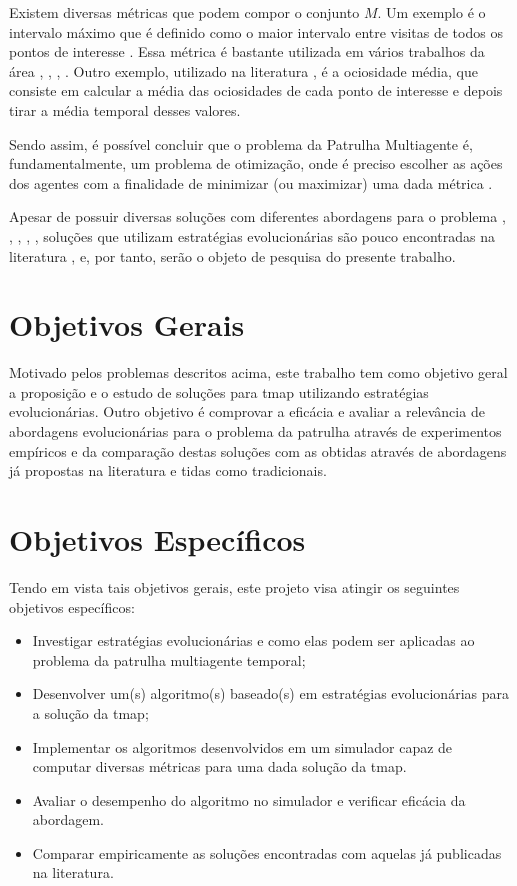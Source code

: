 Existem diversas métricas que podem compor o conjunto $M$. Um exemplo é o 
intervalo máximo que é definido como o maior intervalo entre visitas de todos os 
pontos de interesse \citep{sampaiophd}. Essa métrica é bastante utilizada em 
vários trabalhos da área \citep{6900280}, \cite{Pippin:2013:PBT:2480362.2480378}, 
\citep{Chevaleyre:2004:TAM:1018411.1019013}, \citep{6615158}. Outro exemplo, 
utilizado na literatura \citep{hernandez2013game}, é a ociosidade média, que 
consiste em calcular a média das ociosidades de cada ponto de interesse e depois 
tirar a média temporal desses valores.

Sendo assim, é possível concluir que o problema da Patrulha Multiagente é, 
fundamentalmente, um problema de otimização, onde é preciso escolher as ações 
dos agentes com a finalidade de minimizar (ou maximizar) uma dada métrica 
\citep{sampaiophd}.

Apesar de possuir diversas soluções com diferentes abordagens para o problema 
\citep{Chevaleyre:2004:TAM:1018411.1019013}, 
\citep{Machado:2002:MPE:1765317.1765332}, \citep{Almeida:2004:AAI}, 
\citep{4209122}, \citep{hernandez2013game}, soluções que utilizam estratégias 
evolucionárias \citep{Luke2013Metaheuristics} são pouco encontradas na 
literatura \citep{4630897}, \citep{6900280} e, por tanto, serão o objeto de 
pesquisa do presente trabalho.

\section{Objetivos Gerais}

Motivado pelos problemas descritos acima, este trabalho tem como objetivo geral 
a proposição e o estudo de soluções para \ac{tmap} utilizando estratégias 
evolucionárias. Outro objetivo é comprovar a eficácia e avaliar a relevância de 
abordagens evolucionárias para o problema da patrulha através de experimentos 
empíricos e da comparação destas soluções com as obtidas através de abordagens 
já propostas na literatura e tidas como tradicionais.

\section{Objetivos Específicos}

Tendo em vista tais objetivos gerais, este projeto visa atingir os seguintes 
objetivos específicos:

\begin{itemize}
	\item Investigar estratégias evolucionárias e como elas podem ser aplicadas 
		ao problema da patrulha multiagente temporal;
	\item Desenvolver um(s) algoritmo(s) baseado(s) em estratégias 
		evolucionárias para a solução da \ac{tmap};
	\item Implementar os algoritmos desenvolvidos em um simulador capaz de 
		computar diversas métricas para uma dada solução da \ac{tmap}.
	\item Avaliar o desempenho do algoritmo no simulador e verificar eficácia
		da abordagem.
	\item Comparar empiricamente as soluções encontradas com aquelas já 
		publicadas na literatura.
\end{itemize}